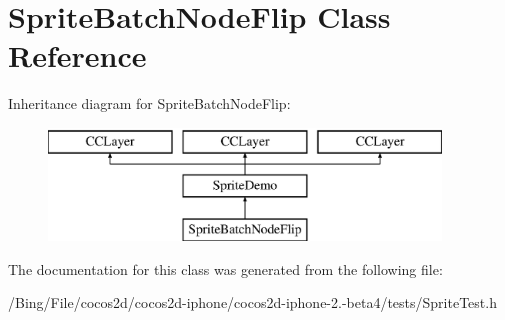 \hypertarget{interface_sprite_batch_node_flip}{\section{Sprite\-Batch\-Node\-Flip Class Reference}
\label{interface_sprite_batch_node_flip}
}
Inheritance diagram for Sprite\-Batch\-Node\-Flip\-:\begin{figure}[H]
\begin{center}
\leavevmode
\includegraphics[height=3.000000cm]{interface_sprite_batch_node_flip}
\end{center}
\end{figure}


The documentation for this class was generated from the following file\-:\begin{DoxyCompactItemize}
\item 
/\-Bing/\-File/cocos2d/cocos2d-\/iphone/cocos2d-\/iphone-\/2.-\/beta4/tests/Sprite\-Test.\-h\end{DoxyCompactItemize}
